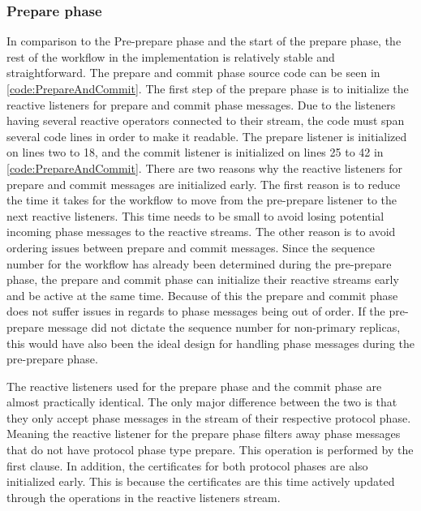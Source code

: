 \subsubsection{Prepare phase}
In comparison to the Pre-prepare phase and the start of the prepare phase, the rest of the workflow in the implementation is relatively stable and straightforward. The prepare and commit phase source code can be seen in \autoref{code:PrepareAndCommit}. The first step of the prepare phase is to initialize the reactive listeners for prepare and commit phase messages. Due to the listeners having several reactive operators connected to their stream, the code must span several code lines in order to make it readable. The prepare listener is initialized on lines two to 18, and the commit listener is initialized on lines 25 to 42 in \autoref{code:PrepareAndCommit}. There are two reasons why the reactive listeners for prepare and commit messages are initialized early. The first reason is to reduce the time it takes for the workflow to move from the pre-prepare listener to the next reactive listeners. This time needs to be small to avoid losing potential incoming phase messages to the reactive streams. 
The other reason is to avoid ordering issues between prepare and commit messages. Since the sequence number for the workflow has already been determined during the pre-prepare phase, the prepare and commit phase can initialize their reactive streams early and be active at the same time. Because of this the prepare and commit phase does not suffer issues in regards to phase messages being out of order. If the pre-prepare message did not dictate the sequence number for non-primary replicas, this would have also been the ideal design for handling phase messages during the pre-prepare phase.

The reactive listeners used for the prepare phase and the commit phase are almost practically identical. The only major difference between the two is that they only accept phase messages in the stream of their respective protocol phase. Meaning the reactive listener for the prepare phase filters away phase messages that do not have protocol phase type prepare. This operation is performed by the first  clause. In addition, the certificates for both protocol phases are also initialized early. This is because the certificates are this time actively updated through the operations in the reactive listeners stream.

